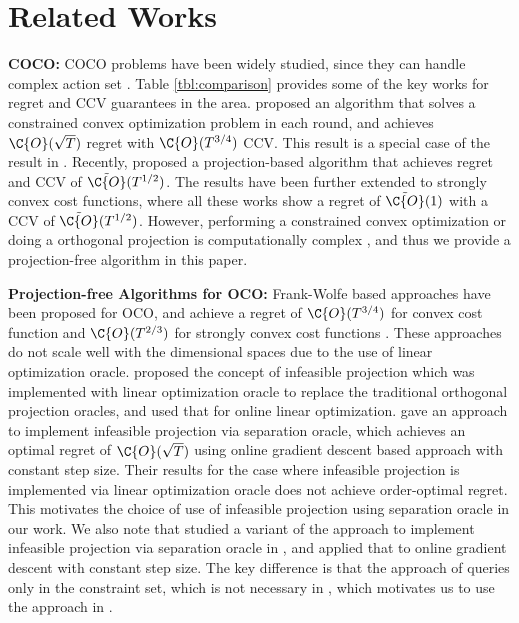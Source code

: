 \section{Related Works}
\noindent \textbf{COCO:} COCO problems have been widely studied, since they can handle complex action set \cite{mahdavi2012trading}. Table \ref{tbl:comparison} provides some of the key works for regret and CCV guarantees in the area. \cite{guo2022online} proposed an algorithm that solves a constrained convex optimization problem in each round, and achieves $\C{O}(\sqrt{T})$ regret with $\C{O}({T}^{3/4})$ CCV. This result is a special case of the result in \cite{yi2023distributed}. Recently, \citet{sinha2024optimal} proposed a projection-based algorithm that achieves regret and CCV of $\Tilde{\C{O}}(T^{1/2})$. The results have been further extended to strongly convex cost functions, where all these works show a regret of $\Tilde{\C{O}}(1)$ with a CCV of $\Tilde{\C{O}}(T^{1/2})$. However, performing a constrained convex optimization or doing a orthogonal projection is computationally complex \cite{garber2022new}, and thus we provide a projection-free algorithm in this paper. 


\noindent \textbf{Projection-free Algorithms for OCO:} Frank-Wolfe based approaches have been proposed for OCO, and achieve a regret of $\C{O}(T^{3/4})$ for convex cost function \cite{pmlr-v37-daniely15,hazan2012projection} and $\C{O}(T^{2/3})$ for strongly convex cost functions \cite{kretzu2021revisiting}. These approaches do not scale well with the dimensional spaces due to the use of linear optimization oracle.  \citet{garber2021efficient} proposed the concept of infeasible projection which was implemented with linear optimization oracle to replace the traditional orthogonal projection oracles, and used that for online linear optimization.  \citet{garber2022new} gave an approach to implement infeasible projection via separation oracle, which achieves an optimal regret of $\C{O}(\sqrt{T})$ using online gradient descent based approach with constant step size. Their results for the case where infeasible projection is implemented via linear optimization oracle does not achieve order-optimal regret. This motivates the choice of use of infeasible projection using separation oracle in our work. We also note that \cite{pedramfar2024linearizable} studied a variant of the approach to implement infeasible projection via separation oracle in \cite{garber2022new}, and applied that to online gradient descent with constant step size. The key difference is that the approach of \cite{pedramfar2024linearizable} queries only in the constraint set, which is not necessary in \cite{garber2022new}, which motivates us to use the approach in \cite{pedramfar2024linearizable}. 




